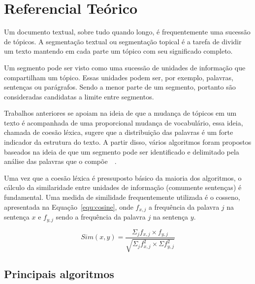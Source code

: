 \section{Referencial Teórico}
	\label{sec:referencial}
	

Um documento textual, sobre tudo quando longo, é frequentemente uma sucessão de tópicos. 
A segmentação textual ou segmentação topical é a tarefa de dividir um texto mantendo em cada parte um tópico com seu significado completo.
	
Um segmento pode ser visto como uma sucessão de unidades de informação que compartilham um tópico. Essas unidades podem ser, por exemplo, palavras, sentenças ou parágrafos. Sendo a menor parte de um segmento, portanto são consideradas candidatas a limite entre segmentos.

Trabalhos anteriores se apoiam na ideia de que a mudança de tópicos em um texto é acompanhada de uma proporcional mudança de vocabulário, essa ideia, chamada de coesão léxica, sugere que a distribuição das palavras é um forte indicador da estrutura do texto. A partir disso, vários algoritmos foram propostos baseados na ideia de que um segmento pode ser identificado e delimitado pela análise das palavras que o compõe~\cite{Galley2003}~\cite{Boguraev2000}.




Uma vez que a coesão léxica é pressuposto básico da maioria dos algoritmos, o cálculo da similaridade entre unidades de informação (comumente sentenças) é fundamental. Uma medida de similidade frequentemente utilizada é o cosseno, apresentada na Equação~\ref{equ:cosine}, onde $f_{x,j}$ a frequência da palavra $j$ na sentença $x$ e $f_{y,j}$ sendo a frequência da palavra $j$ na sentença $y$.


\begin{equation}
Sim(x,y) = \frac
{\Sigma_j f_{x,j} \times f_{y,j}}
{\sqrt{\Sigma_j f^2_{x,j} \times \Sigma f^2_{y,j}}}
\label{equ:cosine}
\end{equation}


\subsection{Principais algoritmos}
	\label{subsec:principaisalgoritimos}

